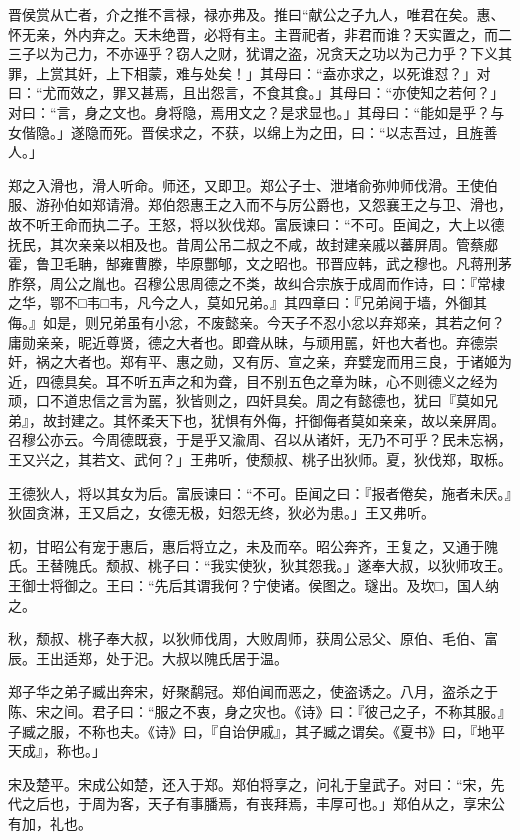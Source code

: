 \documentclass[]{article}
\begin{document}
晋侯赏从亡者，介之推不言禄，禄亦弗及。推曰``献公之子九人，唯君在矣。惠、怀无亲，外内弃之。天未绝晋，必将有主。主晋祀者，非君而谁？天实置之，而二三子以为己力，不亦诬乎？窃人之财，犹谓之盗，况贪天之功以为己力乎？下义其罪，上赏其奸，上下相蒙，难与处矣！」其母曰：``盍亦求之，以死谁怼？」对曰：``尤而效之，罪又甚焉，且出怨言，不食其食。」其母曰：``亦使知之若何？」对曰：``言，身之文也。身将隐，焉用文之？是求显也。」其母曰：``能如是乎？与女偕隐。」遂隐而死。晋侯求之，不获，以绵上为之田，曰：``以志吾过，且旌善人。」

郑之入滑也，滑人听命。师还，又即卫。郑公子士、泄堵俞弥帅师伐滑。王使伯服、游孙伯如郑请滑。郑伯怨惠王之入而不与厉公爵也，又怨襄王之与卫、滑也，故不听王命而执二子。王怒，将以狄伐郑。富辰谏曰：``不可。臣闻之，大上以德抚民，其次亲亲以相及也。昔周公吊二叔之不咸，故封建亲戚以蕃屏周。管蔡郕霍，鲁卫毛聃，郜雍曹滕，毕原酆郇，文之昭也。邗晋应韩，武之穆也。凡蒋刑茅胙祭，周公之胤也。召穆公思周德之不类，故纠合宗族于成周而作诗，曰：『常棣之华，鄂不□韦□韦，凡今之人，莫如兄弟。』其四章曰：『兄弟阋于墙，外御其侮。』如是，则兄弟虽有小忿，不废懿亲。今天子不忍小忿以弃郑亲，其若之何？庸勋亲亲，昵近尊贤，德之大者也。即聋从昧，与顽用嚚，奸也大者也。弃德崇奸，祸之大者也。郑有平、惠之勋，又有厉、宣之亲，弃嬖宠而用三良，于诸姬为近，四德具矣。耳不听五声之和为聋，目不别五色之章为昧，心不则德义之经为顽，口不道忠信之言为嚚，狄皆则之，四奸具矣。周之有懿德也，犹曰『莫如兄弟』，故封建之。其怀柔天下也，犹惧有外侮，扞御侮者莫如亲亲，故以亲屏周。召穆公亦云。今周德既衰，于是乎又渝周、召以从诸奸，无乃不可乎？民未忘祸，王又兴之，其若文、武何？」王弗听，使颓叔、桃子出狄师。夏，狄伐郑，取栎。

王德狄人，将以其女为后。富辰谏曰：``不可。臣闻之曰：『报者倦矣，施者未厌。』狄固贪淋，王又启之，女德无极，妇怨无终，狄必为患。」王又弗听。

初，甘昭公有宠于惠后，惠后将立之，未及而卒。昭公奔齐，王复之，又通于隗氏。王替隗氏。颓叔、桃子曰：``我实使狄，狄其怨我。」遂奉大叔，以狄师攻王。王御士将御之。王曰：``先后其谓我何？宁使诸。侯图之。璲出。及坎□，国人纳之。

秋，颓叔、桃子奉大叔，以狄师伐周，大败周师，获周公忌父、原伯、毛伯、富辰。王出适郑，处于汜。大叔以隗氏居于温。

郑子华之弟子臧出奔宋，好聚鹬冠。郑伯闻而恶之，使盗诱之。八月，盗杀之于陈、宋之间。君子曰：``服之不衷，身之灾也。《诗》曰：『彼己之子，不称其服。』子臧之服，不称也夫。《诗》曰，『自诒伊戚』，其子臧之谓矣。《夏书》曰，『地平天成』，称也。」

宋及楚平。宋成公如楚，还入于郑。郑伯将享之，问礼于皇武子。对曰：``宋，先代之后也，于周为客，天子有事膰焉，有丧拜焉，丰厚可也。」郑伯从之，享宋公有加，礼也。
\end{document}
